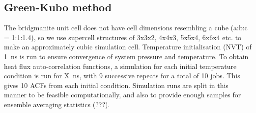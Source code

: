 \documentclass[%
preprint,                                  %
nofootinbib,
 amsmath,amssymb,
 aps,
]{revtex4-1}
\begin{document}





















\subsection{\label{sec:method.gk}Green-Kubo method}

The bridgmanite unit cell does not have cell dimensions resembling a cube (a:b:c = 1:1:1.4), so we use supercell structures of 3x3x2, 4x4x3, 5x5x4, 6x6x4 etc. to make an approximately cubic simulation cell. Temperature initialisation (NVT) of 1~ns is run to ensure convergence of system pressure and temperature. To obtain heat flux auto-correlation functions, a simulation for each initial temperature condition is run for X~ns, with 9 successive repeats for a total of 10 jobs. This gives 10 ACFs from each initial condition. Simulation runs are split in this manner to be feasible computationally, and also to provide enough samples for ensemble averaging statistics (???).
\end{document}
